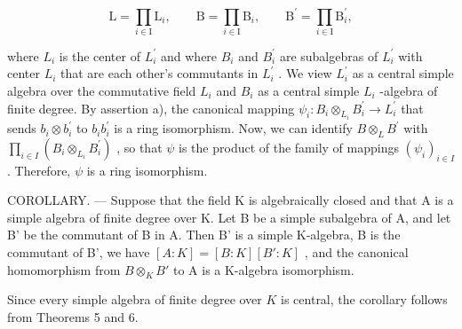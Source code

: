 \[
\mathrm{L} = \prod_ {i \in \mathrm{I}} \mathrm{L} _ {i}, \qquad \mathrm{B} = \prod_ {i \in \mathrm{I}} \mathrm{B} _ {i}, \qquad \mathrm{B} ^ {\prime} = \prod_ {i \in \mathrm{I}} \mathrm{B} _ {i} ^ {\prime},
\]

where \(L_{i}\) is the center of \(L_{i}^{\prime}\) and where \(B_{i}\) and \(B_{i}^{\prime}\) are subalgebras of \(L_{i}^{\prime}\) with center \(L_{i}\) that are each other's commutants in \(L_{i}^{\prime}\) . We view \(L_{i}^{\prime}\) as a central simple algebra over the commutative field \(L_{i}\) and \(B_{i}\) as a central simple \(L_{i}\) -algebra of finite degree. By assertion a), the canonical mapping \(\psi_{i}: B_{i} \otimes_{L_{i}} B_{i}^{\prime} \to L_{i}^{\prime}\) that sends \(b_{i} \otimes b_{i}^{\prime}\) to \(b_{i}b_{i}^{\prime}\) is a ring isomorphism. Now, we can identify \(B \otimes_{L} B^{\prime}\) with \(\prod_{i \in I}(B_{i} \otimes_{L_{i}} B_{i}^{\prime})\) , so that \(\psi\) is the product of the family of mappings \((\psi_{i})_{i \in I}\) . Therefore, \(\psi\) is a ring isomorphism.

COROLLARY. --- Suppose that the field K is algebraically closed and that A is a simple algebra of finite degree over K. Let B be a simple subalgebra of A, and let B' be the commutant of B in A. Then B' is a simple K-algebra, B is the commutant of B', we have \([A:K]=[B:K][B':K]\) , and the canonical homomorphism from \(B\otimes_{K}B'\) to A is a K-algebra isomorphism.

Since every simple algebra of finite degree over \(K\) is central, the corollary follows from Theorems 5 and 6.

